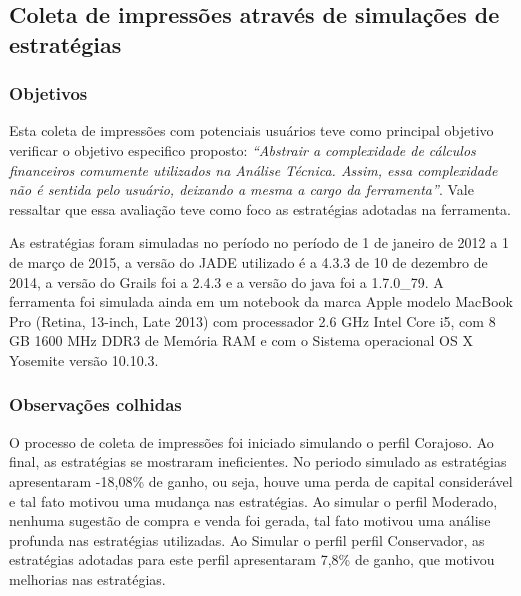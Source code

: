 \subsection{Coleta de impressões através de simulações de estratégias}

\subsubsection{Objetivos}

Esta coleta de impressões com potenciais usuários teve como principal objetivo verificar  o objetivo especifico proposto: \textit{“Abstrair a complexidade de cálculos financeiros comumente utilizados na Análise Técnica. Assim, essa complexidade não é sentida pelo usuário, deixando a mesma a cargo da ferramenta”}. Vale ressaltar que essa avaliação teve como foco as estratégias adotadas na ferramenta.

As estratégias foram simuladas no período no período de 1 de janeiro de 2012 a 1 de março de 2015, a versão do JADE utilizado é a 4.3.3 de 10 de dezembro de 2014, a versão do Grails foi a 2.4.3 e a versão do java foi a 1.7.0\_79. A ferramenta foi simulada ainda em um notebook da marca Apple modelo MacBook Pro (Retina, 13-inch, Late 2013) com processador 2.6 GHz Intel Core i5, com 8 GB 1600 MHz DDR3 de Memória RAM e com o Sistema operacional OS X Yosemite versão 10.10.3.

\subsubsection{Observações colhidas}

O processo de coleta de impressões foi iniciado simulando o perfil Corajoso. Ao final, as estratégias se mostraram ineficientes. No periodo simulado as estratégias apresentaram -18,08\% de ganho, ou seja, houve uma perda de capital considerável e tal fato motivou uma mudança nas estratégias. Ao simular o perfil Moderado, nenhuma sugestão de compra e venda foi gerada, tal fato motivou uma análise profunda nas estratégias utilizadas. Ao Simular o perfil perfil Conservador, as estratégias adotadas para este perfil apresentaram 7,8\% de ganho, que motivou melhorias nas estratégias.

